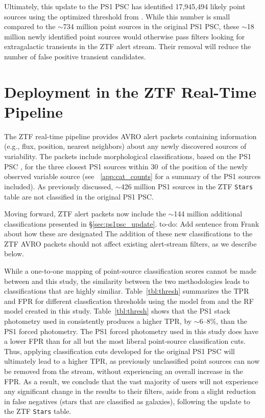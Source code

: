 \documentclass[twocolumn]{aastex63}
\newcommand{\todo}[1]{{\color{magenta} to-do: {#1}}}
\begin{document}
Ultimately, this update to the PS1 PSC has identified 17,945,494 likely point
sources using the optimized threshold from \citet[][RF score $\ge
0.83$]{Tachibana18}. While this number is small compared to the $\sim$734
million point sources in the original PS1 PSC, these $\sim$18 million newly
identified point sources would otherwise pass filters looking for
extragalactic transients in the ZTF alert stream. Their removal will reduce
the number of false positive transient candidates.

\section{Deployment in the ZTF Real-Time Pipeline}\label{sec:discussion}

The ZTF real-time pipeline \citep{Masci19} provides AVRO alert packets
\citep[see][]{Patterson19} containing information (e.g., flux, position,
nearest neighbors) about any newly discovered sources of variability. The
packets include morphological classifications, based on the PS1 PSC
\citep{Tachibana18}, for the three closest PS1 sources within 30\arcsec\ of
the position of the newly observed variable source (see ~\ref{app:cat_counts}
for a summary of the PS1 sources included). As previously discussed, $\sim$426
million PS1 sources in the ZTF \texttt{Stars} table are not classified in the
original PS1 PSC.

Moving forward, ZTF alert packets now include the $\sim$144 million additional
classifications presented in \S\ref{sec:ps1psc_update}. \todo{Add sentence
from Frank about how these are designated} The addition of these new
classifications to the ZTF AVRO packets should not affect existing
alert-stream filters, as we describe below.



While a one-to-one mapping of point-source classification scores cannot be
made between \citet{Tachibana18} and this study, the similarity between the
two methodologies leads to classifications that are highly similiar.
Table~\ref{tbl:thresh} summarizes the TPR and FPR for different classfication
thresholds using the model from \citet{Tachibana18} and the RF model created
in this study. Table~\ref{tbl:thresh} shows that the PS1 stack photometry used
in \citet{Tachibana18} consistently produces a higher TPR, by $\sim$6--8\%,
than the PS1 forced photometry. The PS1 forced photometry used in this study
does have a lower FPR than \citet{Tachibana18} for all but the most liberal
point-source classification cuts. Thus, applying classification cuts developed
for the original PS1 PSC will ultimately lead to a higher TPR, as previously
unclassified point sources can now be removed from the stream, without
experiencing an overall increase in the FPR. As a result, we conclude that the
vast majority of users will not experience any significant change in the
results to their filters, aside from a slight reduction in false negatives
(stars that are classified as galaxies), following the update to the ZTF
\texttt{Stars} table.
\end{document}
